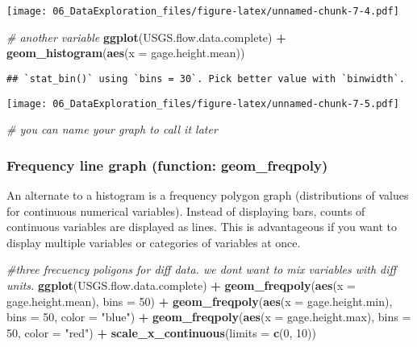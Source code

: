 \documentclass[]{article}
\newenvironment{Shaded}{\begin{snugshade}}{\end{snugshade}}
\newcommand{\KeywordTok}[1]{\textcolor[rgb]{0.13,0.29,0.53}{\textbf{#1}}}
\newcommand{\DataTypeTok}[1]{\textcolor[rgb]{0.13,0.29,0.53}{#1}}
\newcommand{\DecValTok}[1]{\textcolor[rgb]{0.00,0.00,0.81}{#1}}
\newcommand{\StringTok}[1]{\textcolor[rgb]{0.31,0.60,0.02}{#1}}
\newcommand{\CommentTok}[1]{\textcolor[rgb]{0.56,0.35,0.01}{\textit{#1}}}
\newcommand{\OperatorTok}[1]{\textcolor[rgb]{0.81,0.36,0.00}{\textbf{#1}}}
\newcommand{\NormalTok}[1]{#1}
\begin{document}
\texttt{[image: 06\_DataExploration\_files/figure-latex/unnamed-chunk-7-4.pdf]}

\begin{Shaded}
\begin{Highlighting}[]
\CommentTok{# another variable}
\KeywordTok{ggplot}\NormalTok{(USGS.flow.data.complete) }\OperatorTok{+}
\StringTok{  }\KeywordTok{geom_histogram}\NormalTok{(}\KeywordTok{aes}\NormalTok{(}\DataTypeTok{x =}\NormalTok{ gage.height.mean))}
\end{Highlighting}
\end{Shaded}

\begin{verbatim}
## `stat_bin()` using `bins = 30`. Pick better value with `binwidth`.
\end{verbatim}

\texttt{[image: 06\_DataExploration\_files/figure-latex/unnamed-chunk-7-5.pdf]}

\begin{Shaded}
\begin{Highlighting}[]
\CommentTok{# you can name your graph to call it later}
\end{Highlighting}
\end{Shaded}

\subsubsection{Frequency line graph (function:
geom\_freqpoly)}\label{frequency-line-graph-function-geom_freqpoly}

An alternate to a histogram is a frequency polygon graph (distributions
of values for continuous numerical variables). Instead of displaying
bars, counts of continuous variables are displayed as lines. This is
advantageous if you want to display multiple variables or categories of
variables at once.

\begin{Shaded}
\begin{Highlighting}[]
\CommentTok{#three frecuency poligons for diff data. we dont want to mix variables with diff units.}
\KeywordTok{ggplot}\NormalTok{(USGS.flow.data.complete) }\OperatorTok{+}
\StringTok{  }\KeywordTok{geom_freqpoly}\NormalTok{(}\KeywordTok{aes}\NormalTok{(}\DataTypeTok{x =}\NormalTok{ gage.height.mean), }\DataTypeTok{bins =} \DecValTok{50}\NormalTok{) }\OperatorTok{+}
\StringTok{  }\KeywordTok{geom_freqpoly}\NormalTok{(}\KeywordTok{aes}\NormalTok{(}\DataTypeTok{x =}\NormalTok{ gage.height.min), }\DataTypeTok{bins =} \DecValTok{50}\NormalTok{, }\DataTypeTok{color =} \StringTok{"blue"}\NormalTok{) }\OperatorTok{+}
\StringTok{  }\KeywordTok{geom_freqpoly}\NormalTok{(}\KeywordTok{aes}\NormalTok{(}\DataTypeTok{x =}\NormalTok{ gage.height.max), }\DataTypeTok{bins =} \DecValTok{50}\NormalTok{, }\DataTypeTok{color =} \StringTok{"red"}\NormalTok{) }\OperatorTok{+}
\StringTok{  }\KeywordTok{scale_x_continuous}\NormalTok{(}\DataTypeTok{limits =} \KeywordTok{c}\NormalTok{(}\DecValTok{0}\NormalTok{, }\DecValTok{10}\NormalTok{))}
\end{Highlighting}
\end{Shaded}
\end{document}

